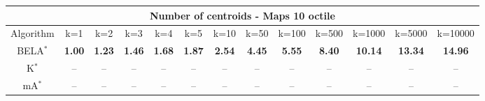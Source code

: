 \begin{tabular}{c|cccccccccccc}\toprule
\multicolumn{13}{c}{Number of centroids - Maps 10 octile}\\ \midrule
Algorithm & k=1 & k=2 & k=3 & k=4 & k=5 & k=10 & k=50 & k=100 & k=500 & k=1000 & k=5000 & k=10000 \\ \midrule
BELA$^*$ & \textbf{1.00} & \textbf{1.23} & \textbf{1.46} & \textbf{1.68} & \textbf{1.87} & \textbf{2.54} & \textbf{4.45} & \textbf{5.55} & \textbf{8.40} & \textbf{10.14} & \textbf{13.34} & \textbf{14.96} \\
K$^*$ & -- & -- & -- & -- & -- & -- & -- & -- & -- & -- & -- & -- \\
mA$^*$ & -- & -- & -- & -- & -- & -- & -- & -- & -- & -- & -- & -- \\ \bottomrule 
\end{tabular}
